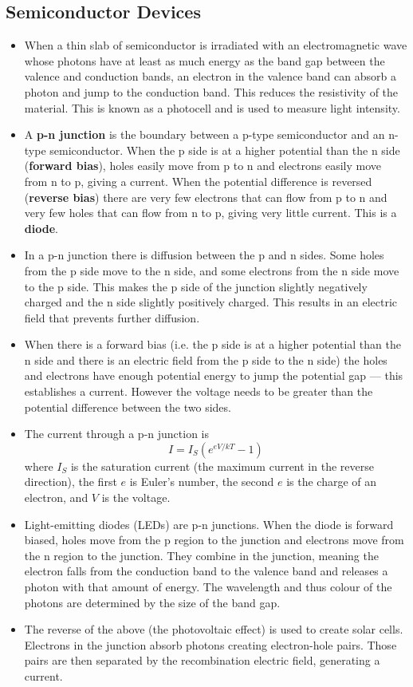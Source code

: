 \documentclass{article}
\begin{document}
\subsection{Semiconductor Devices}

\begin{itemize}
  \item When a thin slab of semiconductor is irradiated with an electromagnetic wave whose photons have at least as much energy as the band gap between the valence and conduction bands, an electron in the valence band can absorb a photon and jump to the conduction band. This reduces the resistivity of the material. This is known as a photocell and is used to measure light intensity.

  \item A \textbf{p-n junction} is the boundary between a p-type semiconductor and an n-type semiconductor. When the p side is at a higher potential than the n side (\textbf{forward bias}), holes easily move from p to n and electrons easily move from n to p, giving a current. When the potential difference is reversed (\textbf{reverse bias}) there are very few electrons that can flow from p to n and very few holes that can flow from n to p, giving very little current. This is a \textbf{diode}.

  \item In a p-n junction there is diffusion between the p and n sides. Some holes from the p side move to the n side, and some electrons from the n side move to the p side. This makes the p side of the junction slightly negatively charged and the n side slightly positively charged. This results in an electric field that prevents further diffusion.

  \item When there is a forward bias (i.e. the p side is at a higher potential than the n side and there is an electric field from the p side to the n side) the holes and electrons have enough potential energy to jump the potential gap — this establishes a current. However the voltage needs to be greater than the potential difference between the two sides.

  \item The current through a p-n junction is \[I = I_S (e^{e V / k T} - 1)\] where $I_S$ is the saturation current (the maximum current in the reverse direction), the first $e$ is Euler's number, the second $e$ is the charge of an electron, and $V$ is the voltage.

  \item Light-emitting diodes (LEDs) are p-n junctions. When the diode is forward biased, holes move from the p region to the junction and electrons move from the n region to the junction. They combine in the junction, meaning the electron falls from the conduction band to the valence band and releases a photon with that amount of energy. The wavelength and thus colour of the photons are determined by the size of the band gap.

  \item The reverse of the above (the photovoltaic effect) is used to create solar cells. Electrons in the junction absorb photons creating electron-hole pairs. Those pairs are then separated by the recombination electric field, generating a current.
\end{itemize}
\end{document}
